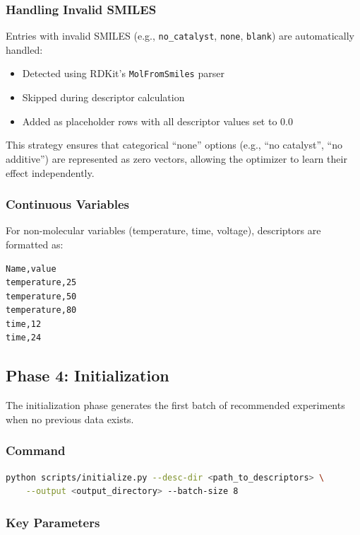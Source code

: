 \documentclass[12pt,a4paper]{article}
\begin{document}
\subsubsection{Handling Invalid SMILES}

Entries with invalid SMILES (e.g., \texttt{no\_catalyst}, \texttt{none}, \texttt{blank}) are automatically handled:

\begin{itemize}
    \item Detected using RDKit's \texttt{MolFromSmiles} parser
    \item Skipped during descriptor calculation
    \item Added as placeholder rows with all descriptor values set to 0.0
\end{itemize}

This strategy ensures that categorical ``none'' options (e.g., ``no catalyst'', ``no additive'') are represented as zero vectors, allowing the optimizer to learn their effect independently.

\subsubsection{Continuous Variables}

For non-molecular variables (temperature, time, voltage), descriptors are formatted as:

\begin{lstlisting}[language=csv]
Name,value
temperature,25
temperature,50
temperature,80
time,12
time,24
\end{lstlisting}

\subsection{Phase 4: Initialization}

The initialization phase generates the first batch of recommended experiments when no previous data exists.

\subsubsection{Command}

\begin{lstlisting}[language=bash]
python scripts/initialize.py --desc-dir <path_to_descriptors> \
    --output <output_directory> --batch-size 8
\end{lstlisting}

\subsubsection{Key Parameters}
\end{document}
